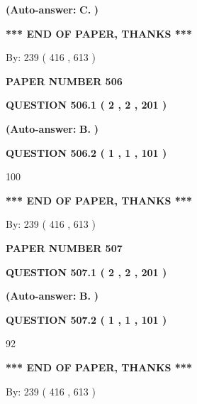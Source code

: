 \documentclass[12pt]{article}
\begin{document}
 
{\textbf{(Auto-answer:}}
{\textbf{\large{
C.}}}
{\textbf{)}}
 
 
   
   
   
   
\vspace{1.0in} 
{\textbf{\large{ *** END OF PAPER, THANKS *** }}} 
   
   
\hspace{1.0in} By: 
 239 ( 416 ,  613 )
   
   
   
   
\newpage 
\setcounter{page}{ 
   506001 } 
   
   
 {\textbf{ \Large{ PAPER NUMBER  506  }}}
   
   
   
   
  
  
{\textbf{\large{QUESTION
506.1 
 ( 2 , 2 , 201 )
}}}
 
 
{\textbf{(Auto-answer:}}
{\textbf{\large{
B.}}}
{\textbf{)}}
 
 
  
  
{\textbf{\large{QUESTION
506.2 
 ( 1 , 1 , 101 )
}}}

100
   
   
   
   
\vspace{1.0in} 
{\textbf{\large{ *** END OF PAPER, THANKS *** }}} 
   
   
\hspace{1.0in} By: 
 239 ( 416 ,  613 )
   
   
   
   
\newpage 
\setcounter{page}{ 
   507001 } 
   
   
 {\textbf{ \Large{ PAPER NUMBER  507  }}}
   
   
   
   
  
  
{\textbf{\large{QUESTION
507.1 
 ( 2 , 2 , 201 )
}}}
 
 
{\textbf{(Auto-answer:}}
{\textbf{\large{
B.}}}
{\textbf{)}}
 
 
  
  
{\textbf{\large{QUESTION
507.2 
 ( 1 , 1 , 101 )
}}}

92
   
   
   
   
\vspace{1.0in} 
{\textbf{\large{ *** END OF PAPER, THANKS *** }}} 
   
   
\hspace{1.0in} By: 
 239 ( 416 ,  613 )
   
   
   
\end{document}
